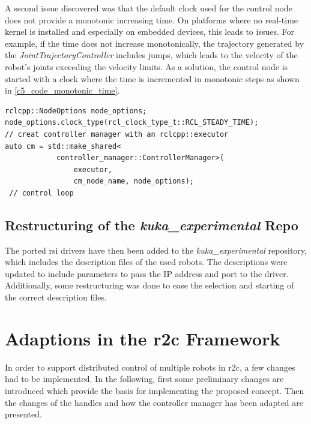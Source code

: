 A second issue discovered was that the default clock used for the control node does not provide a monotonic increasing time. On platforms where no real-time kernel is installed and especially on embedded devices, this leads to issues. For example, if the time does not increase monotonically, the trajectory generated by the \textit{JointTrajectoryController} includes jumps, which leads to the velocity of the robot's joints exceeding the velocity limits. As a solution, the control node is started with a clock where the time is incremented in monotonic steps as shown in \autoref{c5_code_monotonic_time}.
\lstset{language=C++,basicstyle=\small}
\begin{lstlisting}[caption=Small code extract for setting monotonic clock.,label=c5_code_monotonic_time]
rclcpp::NodeOptions node_options;
node_options.clock_type(rcl_clock_type_t::RCL_STEADY_TIME);
// creat controller manager with an rclcpp::executor
auto cm = std::make_shared<
            controller_manager::ControllerManager>(
                executor,
                cm_node_name, node_options);
 // control loop
\end{lstlisting}

\subsection{Restructuring of the \textit{kuka\_experimental} Repo}
The ported \gls{rsi} drivers have then been added to the \textit{kuka\_experimental} repository, which includes the description files of the used robots. The descriptions were updated to include parameters to pass the IP address and port to the driver. Additionally, some restructuring was done to ease the selection and starting of the correct description files.

\section{Adaptions in the \gls{r2c} Framework}
In order to support distributed control of multiple robots in \gls{r2c}, a few changes had to be implemented. In the following, first some preliminary changes are introduced which provide the basis for implementing the proposed concept. Then the changes of the \glspl{handle} and how the controller manager has been adapted are presented.

